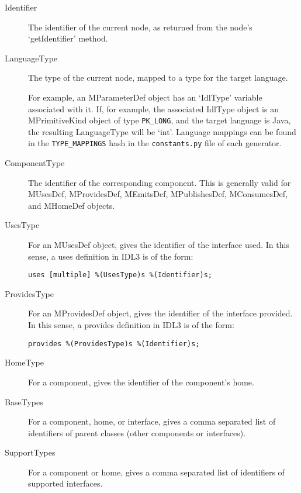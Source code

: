 \begin{description}

\item [Identifier] The identifier of the current node, as returned from the
      node's `getIdentifier' method.

\item [LanguageType] The type of the current node, mapped to a type for the
      target language.

      For example, an MParameterDef object has an `IdlType' variable associated
      with it. If, for example, the associated IdlType object is an
      MPrimitiveKind object of type {\tt PK\_LONG}, and the target language is
      Java, the resulting LanguageType will be `int'. Language mappings can be
      found in the {\tt TYPE\_MAPPINGS} hash in the {\tt constants.py} file of
      each generator.

\item [ComponentType] The identifier of the corresponding component. This is
      generally valid for MUsesDef, MProvidesDef, MEmitsDef, MPublishesDef,
      MConsumesDef, and MHomeDef objects.

\item [UsesType] For an MUsesDef object, gives the identifier of the interface
      used. In this sense, a uses definition in IDL3 is of the form:

\begin{verbatim}
uses [multiple] %(UsesType)s %(Identifier)s;
\end{verbatim}

\item [ProvidesType] For an MProvidesDef object, gives the identifier of the
      interface provided. In this sense, a provides definition in IDL3 is of the
      form:

\begin{verbatim}
provides %(ProvidesType)s %(Identifier)s;
\end{verbatim}

\item [HomeType] For a component, gives the identifier of the component's
      home.

\item [BaseTypes] For a component, home, or interface, gives a comma separated
      list of identifiers of parent classes (other components or interfaces).

\item [SupportTypes] For a component or home, gives a comma separated list of
      identifiers of supported interfaces.

\end{description}

